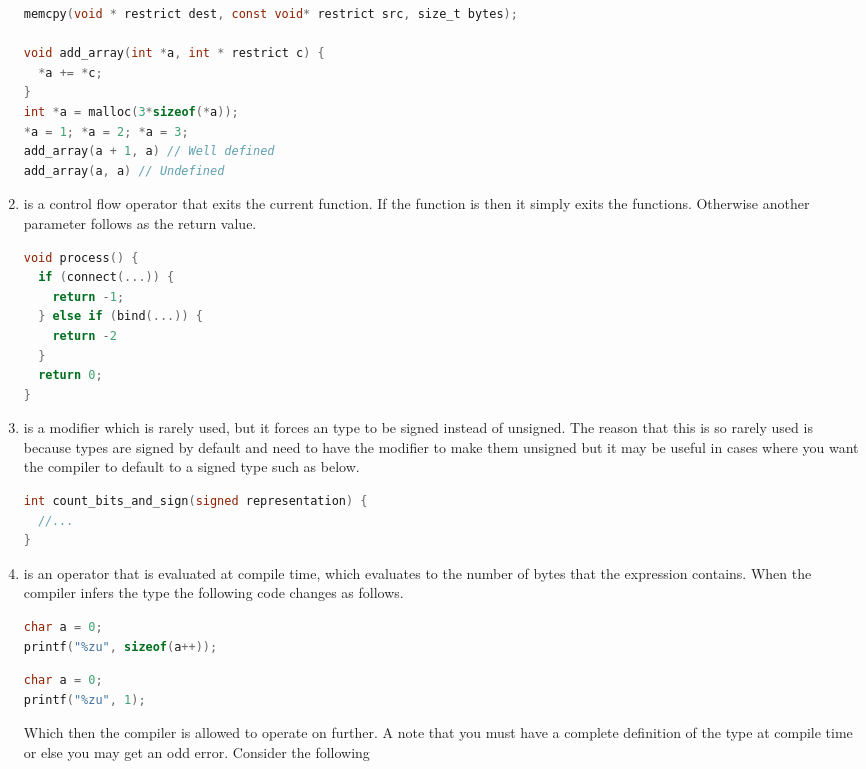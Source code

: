 \begin{enumerate}
	      \begin{lstlisting}[language=C]
memcpy(void * restrict dest, const void* restrict src, size_t bytes);

void add_array(int *a, int * restrict c) {
  *a += *c;
}
int *a = malloc(3*sizeof(*a));
*a = 1; *a = 2; *a = 3;
add_array(a + 1, a) // Well defined
add_array(a, a) // Undefined
\end{lstlisting}
	    \item {} is a control flow operator that exits the current function.
        If the function is  then it simply exits the functions.
        Otherwise another parameter follows as the return value.

	      \begin{lstlisting}[language=C]
void process() {
  if (connect(...)) {
    return -1;
  } else if (bind(...)) {
    return -2
  }
  return 0;
}
\end{lstlisting}

	    \item {} is a modifier which is rarely used, but it forces an type to be signed instead of unsigned.
        The reason that this is so rarely used is because types are signed by default and need to have the  modifier to make them unsigned but it may be useful in cases where you want the compiler to default to a signed type such as below.

	      \begin{lstlisting}[language=C]
int count_bits_and_sign(signed representation) {
  //...
}
\end{lstlisting}
	    \item {} is an operator that is evaluated at compile time, which evaluates to the number of bytes that the expression contains.
        When the compiler infers the type the following code changes as follows.
	      \begin{lstlisting}[language=C]
char a = 0;
printf("%zu", sizeof(a++));
\end{lstlisting}

	      \begin{lstlisting}[language=C]
char a = 0;
printf("%zu", 1);
\end{lstlisting}

	      Which then the compiler is allowed to operate on further.
        A note that you must have a complete definition of the type at compile time or else you may get an odd error.
        Consider the following


\end{enumerate}
